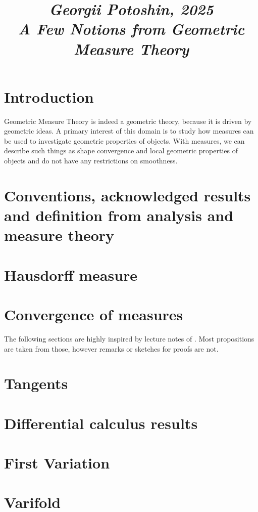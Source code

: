 \documentclass{article}
\begin{document}
\title{
\vspace{-1cm}
\textit{\small{Georgii Potoshin, 2025}}\\
\vspace{0.3ex}
\textit{\huge{A Few Notions from Geometric Measure Theory}}\vspace{1ex}
}
\date{\vspace{-5ex}}
\maketitle

\section{Introduction}
Geometric Measure Theory is indeed a geometric theory, because it is
driven by geometric ideas. A primary interest of this domain is to study how
measures can be used to investigate geometric properties of objects. With measures,
we can describe such things as shape convergence and local geometric properties
of objects and do not have any restrictions on smoothness.

\section{Conventions, acknowledged results and definition from analysis and measure theory}


\section{Hausdorff measure}


\section{Convergence of measures}


The following sections are highly inspired by lecture notes of \cite{giovanni_alberti}.
Most propositions are taken from those, however remarks or sketches for proofs
are not.

\section{Tangents}


\section{Differential calculus results}


\section{First Variation}


\section{Varifold}


\medskip


\end{document}

